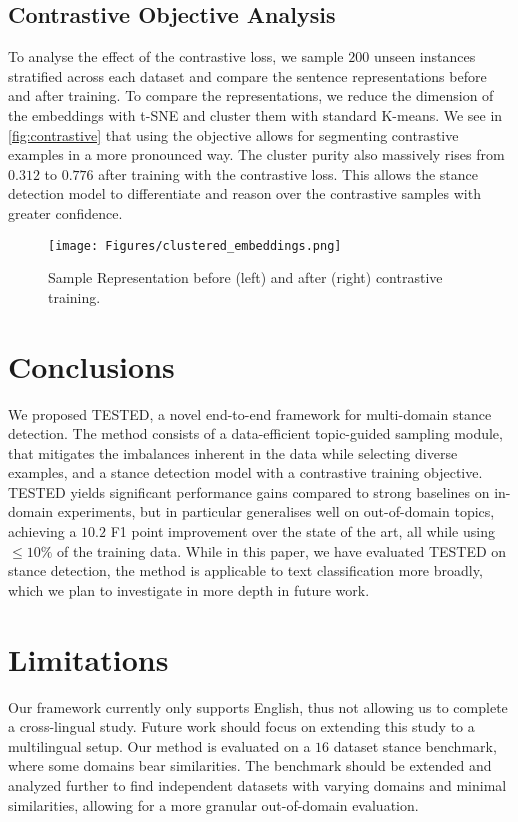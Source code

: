 \documentclass[11pt]{article}
\begin{document}
\subsection{Contrastive Objective Analysis}
\label{subsec:contrastive}

To analyse the effect of the contrastive loss, we sample $200$ unseen instances stratified across each dataset and compare the sentence representations before and after training. To compare the representations, we reduce the dimension of the embeddings with t-SNE and cluster them with standard K-means. We see in \autoref{fig:contrastive} that using the objective allows for segmenting contrastive examples in a more pronounced way. The cluster purity also massively rises from $0.312$ to $0.776$ after training with the contrastive loss. This allows the stance detection model to differentiate and reason over the contrastive samples with greater confidence.

\begin{figure}
\centering
\texttt{[image: Figures/clustered\_embeddings.png]}
\caption{Sample Representation before (left) and after (right) contrastive training.}
\label{fig:contrastive}
\end{figure}

\section{Conclusions}
\label{sec:conclusions}

We proposed TESTED, a novel end-to-end framework for multi-domain stance detection. The method consists of a data-efficient topic-guided sampling module, that mitigates the imbalances inherent in the data while selecting diverse examples, and a stance detection model with a contrastive training objective. TESTED yields significant performance gains compared to strong baselines on in-domain experiments, but in particular generalises well on out-of-domain topics, achieving a $10.2$ F1 point improvement over the state of the art, all while using $\leq10\%$ of the training data. While in this paper, we have evaluated TESTED on stance detection, the method is applicable to text classification more broadly, which we plan to investigate in more depth in future work. 

\section*{Limitations}

Our framework currently only supports English, thus not allowing us to complete a cross-lingual study. Future work should focus on extending this study to a multilingual setup. Our method is evaluated on a $16$ dataset stance benchmark, where some domains bear similarities. The benchmark should be extended and analyzed further to find independent datasets with varying domains and minimal similarities, allowing for a more granular out-of-domain evaluation.
\end{document}
